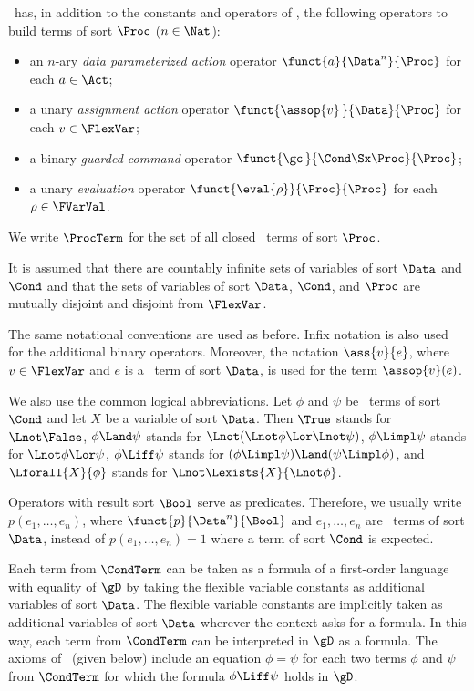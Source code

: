\documentclass[runningheads]{llncs}
\begin{document}
\deACPei\ has, in addition to the constants and operators of \ACPei, 
the following operators to build terms of sort $\Proc$ ($n \in \Nat$):
\begin{itemize}
\item
an $n$-ary \emph{data parameterized action} operator
$\funct{a}{\Data ^n}{\Proc}$ for each $a \in \Act$;
\item
a unary \emph{assignment action} operator
$\funct{\assop{v}\,}{\Data}{\Proc}$ for each $v \in \FlexVar$;
\item
a binary \emph{guarded command} operator 
$\funct{\gc\,}{\Cond \Sx \Proc}{\Proc}$;
\item
a unary \emph{evaluation} operator 
$\funct{\eval{\rho}}{\Proc}{\Proc}$ for each $\rho \in \FVarVal$.
\end{itemize}
We write $\ProcTerm$ for the set of all closed \deACPei\ terms of sort 
$\Proc$.

It is assumed that there are countably infinite sets of variables of 
sort $\Data$ and $\Cond$ and that the sets of variables of sort $\Data$, 
$\Cond$, and $\Proc$ are mutually disjoint and disjoint from $\FlexVar$.

The same notational conventions are used as before.
Infix notation is also used for the additional binary operators.
Moreover, the notation $\ass{v}{e}$, where $v \in \FlexVar$ and $e$ is a 
\deACPei\ term of sort $\Data$, is used for the term $\assop{v}(e)$.

We also use the common logical abbreviations.
Let $\phi$ and $\psi$ be \deACPei\ terms of sort $\Cond$ and
let $X$ be a variable of sort $\Data$.
Then $\True$ stands for $\Lnot \False$,
$\phi \Land \psi$ stands for $\Lnot (\Lnot \phi \Lor \Lnot \psi)$,
$\phi \Limpl \psi$ stands for $\Lnot \phi \Lor \psi$,
$\phi \Liff \psi$ stands for 
$(\phi \Limpl \psi) \Land (\psi \Limpl \phi)$, and
$\Lforall{X}{\phi}$ stands for $\Lnot \Lexists{X}{\Lnot \phi}$.

Operators with result sort $\Bool$ serve as predicates.
Therefore, we usually write $p(e_1,\ldots,e_n)$, where 
$\funct{p}{\Data^n}{\Bool}$ and $e_1,\ldots,e_n$ are \deACPei\ terms of 
sort $\Data$, instead of  $p(e_1,\ldots,e_n) = 1$ where a term of sort 
$\Cond$ is expected.

Each term from $\CondTerm$ can be taken as a formula of a first-order 
language with equality of $\gD$ by taking the flexible variable 
constants as additional variables of sort $\Data$.
The flexible variable constants are implicitly taken as additional 
variables of sort $\Data$ wherever the context asks for a formula.
In this way, each term from $\CondTerm$ can be interpreted in $\gD$ as a
formula.
%
The axioms of \deACPei\ (given below) include an equation $\phi = \psi$ 
for each two terms $\phi$ and $\psi$ from $\CondTerm$ for which the 
formula $\phi \Liff \psi$ holds in $\gD$.
\end{document}

